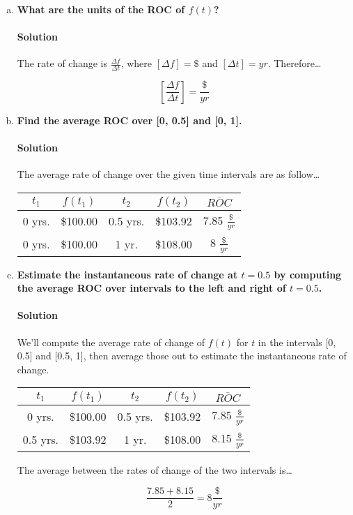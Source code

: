 \documentclass{article}
\begin{document}
  \begin{enumerate}[(a)]
    \item \textbf{What are the units of the ROC of \(f(t)\)?}
    \paragraph{Solution} The rate of change is \(\frac{\Delta{f}}{\Delta{t}}\), where \([\Delta{f}] = \$\) and \([\Delta{t}] = yr\). Therefore\dots
  
    \begin{equation}
      \boxed{[\frac{\Delta{f}}{\Delta{t}}] = \frac{\$}{yr}}
    \end{equation}

    \item \textbf{Find the average ROC over [0, 0.5] and [0, 1].}
    \paragraph{Solution} The average rate of change over the given time intervals are as follow\dots

    \begin{center}
      \begin{tabular}{||c c c c | c||}
      \hline
      \(t_{1}\) & \(f(t_{1})\) & \(t_{2}\) & \(f(t_{2})\) & \(\overline{ROC}\) \\
      \hline\hline
      0 yrs. & \$100.00 & 0.5 yrs. & \$103.92 & 7.85 \(\frac{\$}{yr}\) \\
      \hline
      0 yrs. & \$100.00 & 1 yr. & \$108.00 & 8 \(\frac{\$}{yr}\) \\
      \hline
      \end{tabular}
    \end{center}

    \item \textbf{Estimate the instantaneous rate of change at \(t=0.5\) by computing the average ROC over intervals to the left and right of \(t=0.5\).}

    \paragraph{Solution} We'll compute the average rate of change of \(f(t)\) for \(t\) in the intervals [0, 0.5] and [0.5, 1], then average those out to estimate the instantaneous rate of change.

    \begin{center}
      \begin{tabular}{||c c c c | c||}
      \hline
      \(t_{1}\) & \(f(t_{1})\) & \(t_{2}\) & \(f(t_{2})\) & \(\overline{ROC}\) \\
      \hline\hline
      0 yrs. & \$100.00 & 0.5 yrs. & \$103.92 & 7.85 \(\frac{\$}{yr}\) \\
      \hline
      0.5 yrs. & \$103.92 & 1 yr. & \$108.00 & 8.15 \(\frac{\$}{yr}\) \\
      \hline
      \end{tabular}
    \end{center}

    The average between the rates of change of the two intervals is\dots

    \begin{equation}
      \frac{7.85 + 8.15}{2} = \boxed{8 \frac{\$}{yr}}
    \end{equation}
  \end{enumerate}
\end{document}
